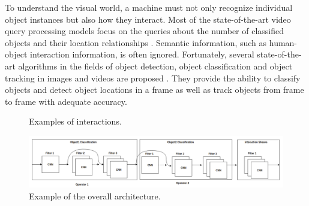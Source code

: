 \documentclass[sigconf]{acmart}
\begin{document}
To understand the visual world, a machine must not only recognize individual object instances but also how they interact. Most of the state-of-the-art video query processing models focus on the queries about the number of classified objects and their location relationships \cite{kang2017noscope, kang2018blazeit, Xarchakos2019, koudas2020video}. Semantic information, such as human-object interaction information, is often ignored. Fortunately, several state-of-the-art algorithms in the fields of object detection, object classification and object tracking in images and videos are proposed \cite{girshick2014rich, gkioxari2018detecting, krizhevsky2012imagenet, simonyan2014very}. They provide the ability to classify objects and detect object locations in a frame as well as track objects from frame to frame with adequate accuracy. 

\begin{figure}[H]
  \centering
  \caption{Examples of interactions.}
  \label{fig:examples} %
\end{figure}

\begin{figure}[h]
\centering
\includegraphics[width=1\textwidth]{graphs/architecture.png}
\caption{Example of the overall architecture.}
\label{fig:architecture}
\end{figure}
\end{document}
